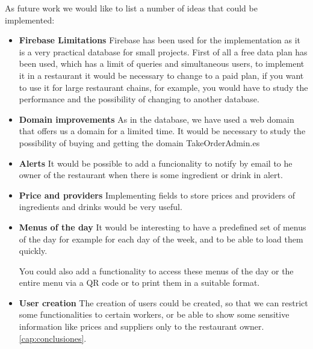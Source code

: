 As future work we would like to list a number of ideas that could be implemented:
\begin{itemize}

\item \textbf{Firebase Limitations}
Firebase has been used for the implementation as it is a very practical database for small projects. 
First of all a free data plan has been used, which has a limit of queries and simultaneous users, to implement it in a restaurant it would be necessary to change to a paid plan, if you want to use it for large restaurant chains, for example, you would have to study the performance and the possibility of changing to another database.

 \item \textbf{Domain improvements}
As in the database, we have used a web domain that offers us a domain for a limited time. It would be necessary to study the possibility of buying and getting the domain TakeOrderAdmin.es 

 \item \textbf{Alerts}
It would be possible to add a funcionality to notify by email to he owner of the restaurant when there is some ingredient or drink in alert.

 \item \textbf{Price and providers}
Implementing fields to store prices and providers of ingredients and drinks would be very useful.

 \item \textbf{Menus of the day}
It would be interesting to have a predefined set of menus of the day for example for each day of the week, and to be able to load them quickly.

You could also add a functionality to access these menus of the day or the entire menu via a QR code or to print them in a suitable format.

\item \textbf{User creation}
The creation of users could be created, so that we can restrict some functionalities to certain workers, or be able to show some sensitive information like prices and suppliers only to the restaurant owner.  \ref{cap:conclusiones}.

\end{itemize}

